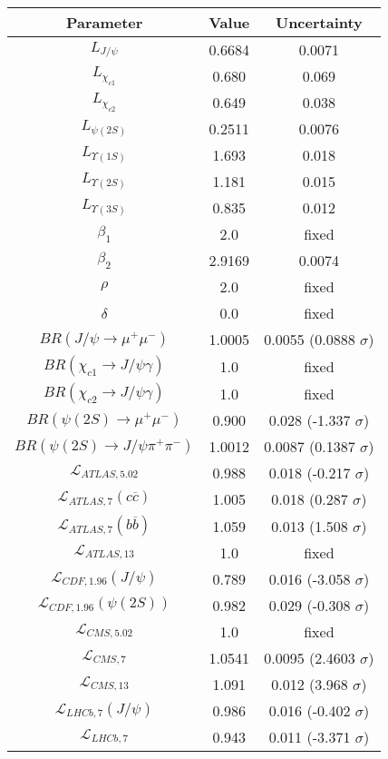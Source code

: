 \begin{table}[h!]
\centering
\begin{tabular}{c|c|c}
Parameter & Value & Uncertainty \\
\hline
$L_{J/\psi}$ & 0.6684 & 0.0071 \\
$L_{\chi_{c1}}$ & 0.680 & 0.069 \\
$L_{\chi_{c2}}$ & 0.649 & 0.038 \\
$L_{\psi(2S)}$ & 0.2511 & 0.0076 \\
$L_{\Upsilon(1S)}$ & 1.693 & 0.018 \\
$L_{\Upsilon(2S)}$ & 1.181 & 0.015 \\
$L_{\Upsilon(3S)}$ & 0.835 & 0.012 \\
$\beta_1$ & 2.0 & fixed \\
$\beta_2$ & 2.9169 & 0.0074 \\
$\rho$ & 2.0 & fixed \\
$\delta$ & 0.0 & fixed \\
$BR(J/\psi\rightarrow\mu^+\mu^-)$ & 1.0005 & 0.0055 (0.0888 $\sigma$) \\
$BR(\chi_{c1}\rightarrow J/\psi\gamma)$ & 1.0 & fixed \\
$BR(\chi_{c2}\rightarrow J/\psi\gamma)$ & 1.0 & fixed \\
$BR(\psi(2S)\rightarrow\mu^+\mu^-)$ & 0.900 & 0.028 (-1.337 $\sigma$) \\
$BR(\psi(2S)\rightarrow J/\psi\pi^+\pi^-)$ & 1.0012 & 0.0087 (0.1387 $\sigma$) \\
$\mathcal L_{ATLAS,5.02}$ & 0.988 & 0.018 (-0.217 $\sigma$) \\
$\mathcal L_{ATLAS,7}(c\overline c)$ & 1.005 & 0.018 (0.287 $\sigma$) \\
$\mathcal L_{ATLAS,7}(b\overline b)$ & 1.059 & 0.013 (1.508 $\sigma$) \\
$\mathcal L_{ATLAS,13}$ & 1.0 & fixed \\
$\mathcal L_{CDF,1.96}(J/\psi)$ & 0.789 & 0.016 (-3.058 $\sigma$) \\
$\mathcal L_{CDF,1.96}(\psi(2S))$ & 0.982 & 0.029 (-0.308 $\sigma$) \\
$\mathcal L_{CMS,5.02}$ & 1.0 & fixed \\
$\mathcal L_{CMS,7}$ & 1.0541 & 0.0095 (2.4603 $\sigma$) \\
$\mathcal L_{CMS,13}$ & 1.091 & 0.012 (3.968 $\sigma$) \\
$\mathcal L_{LHCb,7}(J/\psi)$ & 0.986 & 0.016 (-0.402 $\sigma$) \\
$\mathcal L_{LHCb,7}$ & 0.943 & 0.011 (-3.371 $\sigma$) \\

\end{tabular}
\end{table}
